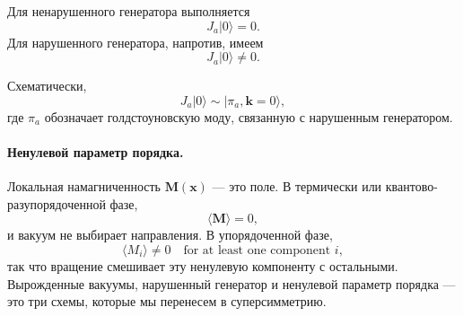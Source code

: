 Для ненарушенного генератора выполняется
\begin{equation}
J_a|0\rangle=0.
\label{eq:l9-unbroken-generator}
\end{equation}
Для нарушенного генератора, напротив, имеем
\begin{equation}
J_a|0\rangle\neq0.
\label{eq:l9-broken-generator}
\end{equation}

\begin{classroomqa}
\end{classroomqa}

\begin{classroomqa}
\end{classroomqa}

Схематически,
\begin{equation}
J_a|0\rangle
\sim
|\pi_a,\mathbf k=0\rangle,
\label{eq:l9-generator-goldstone}
\end{equation}
где \(\pi_a\) обозначает голдстоуновскую моду, связанную с нарушенным генератором.

\paragraph{Ненулевой параметр порядка.}
Локальная намагниченность \(\mathbf M(\mathbf x)\) — это поле. В термически или квантово-разупорядоченной фазе,
\begin{equation}
\langle\mathbf M\rangle=0,
\end{equation}
и вакуум не выбирает направления. В упорядоченной фазе,
\begin{equation}
\langle M_i\rangle\neq0
\quad\text{for at least one component }i,
\label{eq:l9-magnetization-order}
\end{equation}
так что вращение смешивает эту ненулевую компоненту с остальными. Вырожденные вакуумы, нарушенный генератор и ненулевой параметр порядка — это три схемы, которые мы перенесем в суперсимметрию.

